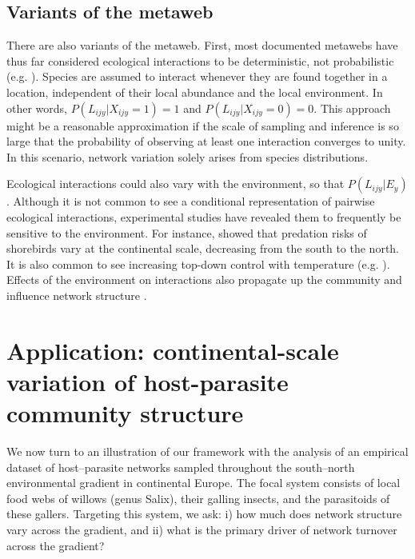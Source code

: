 \documentclass[12pt]{article}
\begin{document}
\subsection*{Variants of the metaweb}

There are also variants of the metaweb. First, most documented metawebs have
thus far considered ecological interactions to be deterministic, not
probabilistic (e.g. \citealt{Havens1992, Wood2015}). Species are assumed to
interact whenever they are found together in a location, independent of their
local abundance and the local environment. In other words,
$P(L_{ijy}|X_{ijy}=1) = 1$ and $P(L_{ijy}|X_{ijy}=0) = 0$. This approach might
be a reasonable approximation if the scale of sampling and inference is so
large that the probability of observing at least one interaction converges to
unity. In this scenario, network variation solely arises from species
distributions.

Ecological interactions could also vary with the environment, so that $P(L_{ijy}
|E_y)$. Although it is not common to see a conditional representation of
pairwise ecological interactions, experimental studies have revealed them to
frequently be sensitive to the environment. For instance, \citep{Mckinnon2010} showed
that predation risks of shorebirds vary at the continental scale, decreasing
from the south to the north. It is also common to see increasing top-down
control with temperature (e.g. \citealt{Shurin2012, Gray2016}). Effects of the
environment on interactions also propagate up the community and influence network
structure \citep{Tylianakis2007, Woodward2010; Petchey2010; Lelong2015}.


\section*{Application: continental-scale variation of host-parasite community structure}

We now turn to an illustration of our framework with the analysis of an
empirical dataset of host–parasite networks sampled throughout the south–north
environmental gradient in continental Europe. The focal system consists of
local food webs of willows (genus Salix), their galling insects, and the
parasitoids of these gallers. Targeting this system, we ask: i) how much does
network structure vary across the gradient, and ii) what is the primary driver
of network turnover across the gradient?
\end{document}
